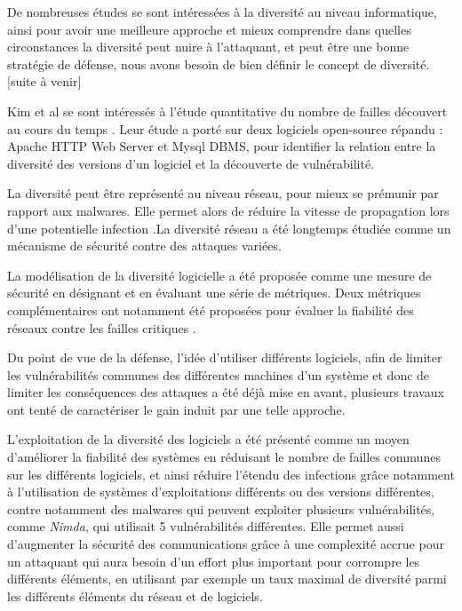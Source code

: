 De nombreuses études se sont intéressées à la diversité au niveau informatique, ainsi pour avoir une meilleure approche et mieux comprendre dans quelles circonstances la diversité peut nuire à l’attaquant, et peut être une bonne stratégie de défense, nous avons besoin de bien définir le concept de diversité. 
[suite à venir]

Kim et al se sont intéressés à l’étude quantitative du nombre de failles découvert au cours du temps \cite{vulnerabilityDiscovery}. Leur étude a porté sur deux logiciels open-source répandu : Apache HTTP Web Server et Mysql DBMS, pour identifier la relation entre la diversité des versions d’un logiciel et la découverte de vulnérabilité.

La diversité peut être représenté au niveau réseau, pour mieux se prémunir par rapport aux malwares. Elle permet alors de réduire la vitesse de propagation lors d’une potentielle infection \cite{OptimisingNetwork}.La diversité réseau a été longtemps étudiée comme un mécanisme de sécurité contre des attaques variées.

La modélisation de la diversité logicielle a été proposée comme une mesure de sécurité en désignant et en évaluant une série de métriques. Deux métriques complémentaires ont notamment été proposées pour évaluer la fiabilité des réseaux contre les failles critiques \cite{networkDiversity}.

Du point de vue de la défense, l'idée d'utiliser différents logiciels, afin de limiter les vulnérabilités communes des différentes machines d’un système et donc de limiter les conséquences des attaques a été déjà mise en avant, plusieurs
travaux ont tenté de caractériser le gain induit par une telle approche\cite{softwareDiversity:Security}.

L'exploitation de la diversité des logiciels a été présenté comme un moyen d'améliorer la fiabilité des systèmes en réduisant le nombre de failles communes sur les différents logiciels, et ainsi réduire l’étendu des infections grâce notamment à l’utilisation de systèmes d'exploitations différents ou des versions différentes,\cite{softwareDiversityPracticalStatistics}
contre notamment des malwares qui peuvent exploiter plusieurs vulnérabilités, comme \textit{Nimda}, qui utilisait 5 vulnérabilités différentes. 
Elle permet aussi d'augmenter la sécurité des communications grâce à une complexité accrue pour un attaquant qui aura besoin d’un effort plus important pour corrompre les différents éléments, en utilisant par exemple un taux maximal de diversité\cite{maximalRatio} parmi les différents éléments du réseau et de logiciels. 

